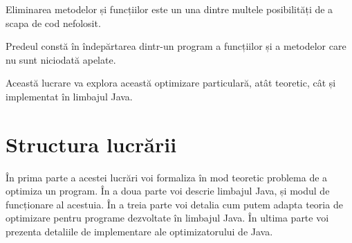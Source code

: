 Eliminarea metodelor și funcțiilor este un una dintre multele
posibilități de a scapa de cod nefolosit.

Predeul constă în îndepărtarea dintr-un program a funcțiilor și a
metodelor care nu sunt niciodată apelate.

Această lucrare va explora această optimizare particulară, atât
teoretic, cât și implementat în limbajul Java.

\section{Structura lucrării}

În prima parte a acestei lucrări voi formaliza în mod teoretic
problema de a optimiza un program.
În a doua parte voi descrie limbajul Java, și modul de
funcționare al acestuia.
În a treia parte voi detalia cum putem adapta teoria de
optimizare pentru programe dezvoltate în limbajul Java.
În ultima parte voi prezenta detaliile de implementare ale
optimizatorului de Java.
